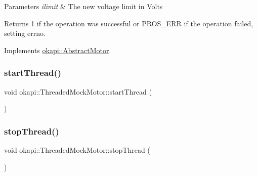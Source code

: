 \begin{DoxyParams}{Parameters}
{\em ilimit} & The new voltage limit in Volts \\
\hline
\end{DoxyParams}
\begin{DoxyReturn}{Returns}
1 if the operation was successful or P\+R\+O\+S\+\_\+\+E\+RR if the operation failed, setting errno. 
\end{DoxyReturn}


Implements \mbox{\hyperlink{classokapi_1_1AbstractMotor_a2f33faf946b99cd34e9a591ccc33d644}{okapi\+::\+Abstract\+Motor}}.

\mbox{\label{classokapi_1_1ThreadedMockMotor_a270dd8f9dd65003a9167fb6f9207db96}} 
\subsubsection{\texorpdfstring{startThread()}{startThread()}}
{\footnotesize\ttfamily void okapi\+::\+Threaded\+Mock\+Motor\+::start\+Thread (\begin{DoxyParamCaption}{ }\end{DoxyParamCaption})}

\mbox{\label{classokapi_1_1ThreadedMockMotor_a18f192acedca2cb38b3391d409e74bfd}} 
\subsubsection{\texorpdfstring{stopThread()}{stopThread()}}
{\footnotesize\ttfamily void okapi\+::\+Threaded\+Mock\+Motor\+::stop\+Thread (\begin{DoxyParamCaption}{ }\end{DoxyParamCaption})}

\mbox{\label{classokapi_1_1ThreadedMockMotor_aa7ccc33d3100bf1d58c3d3cb40cad6de}} 
